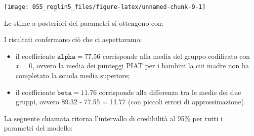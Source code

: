\documentclass[
  10pt,
  italian,
  a4paper,
  extrafontsizes,onecolumn,openright
  ]{memoir}
\newenvironment{Shaded}{\begin{snugshade}}{\end{snugshade}}
\newcommand{\CommentTok}[1]{\textcolor[rgb]{0.56,0.35,0.01}{\textit{#1}}}
\newcommand{\FunctionTok}[1]{\textcolor[rgb]{0.00,0.00,0.00}{#1}}
\newcommand{\NormalTok}[1]{#1}
\newcommand{\SpecialCharTok}[1]{\textcolor[rgb]{0.00,0.00,0.00}{#1}}
\newcommand{\StringTok}[1]{\textcolor[rgb]{0.31,0.60,0.02}{#1}}
\providecommand{\tightlist}{%
  \setlength{\itemsep}{0pt}\setlength{\parskip}{0pt}}
\begin{document}
\begin{center}\texttt{[image: 055\_reglin5\_files/figure-latex/unnamed-chunk-9-1]} \end{center}

Le stime a posteriori dei parametri si ottengono con:

\begin{Shaded}
\end{Shaded}

I risultati confermano ciò che ci aspettavamo:

\begin{itemize}
\tightlist
\item
  il coefficiente \(\texttt{alpha} = 77.56\) corrisponde alla media del gruppo codificato con \(x = 0\), ovvero la media dei punteggi PIAT per i bambini la cui madre non ha completato la scuola media superiore;
\item
  il coefficiente \(\texttt{beta} = 11.76\) corrisponde alla differenza tra le medie dei due gruppi, ovvero 89.32 - 77.55 = 11.77 (con piccoli errori di approssimazione).
\end{itemize}

La seguente chiamata ritorna l'intervallo di credibilità al 95\% per tutti i parametri del modello:
\end{document}
